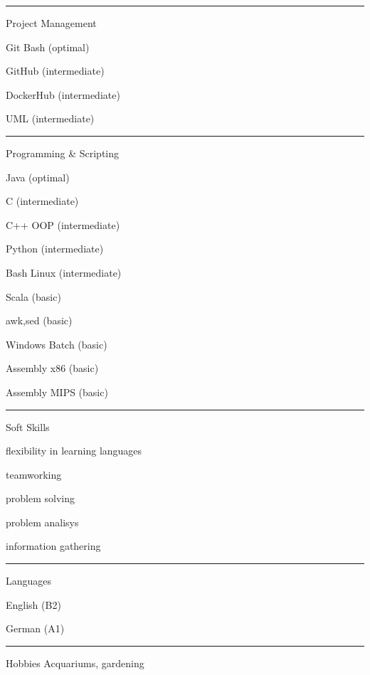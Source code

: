 \documentclass[a4paper]{letter}
\begin{document}
\begin{minipage}[t]{0.30\textwidth}
\setlength{\baselineskip}{1.5\baselineskip}
\color{white}

\vspace{2.1 mm}
\rule{\linewidth}{0.4pt}

{\large Project Management}

\faCode \quad Git Bash (optimal)

\faCode \quad GitHub (intermediate)

\faCode \quad DockerHub (intermediate)

\faCode \quad UML (intermediate)


\rule{\linewidth}{0.4pt}

{\large Programming \& Scripting}

\faCode \quad Java (optimal)

\faCode \quad C (intermediate)

\faCode \quad C++ OOP (intermediate)

\faCode \quad Python (intermediate)

\faCode \quad Bash Linux (intermediate)

\faCode \quad Scala (basic)

\faCode \quad awk,sed (basic)

\faCode \quad Windows Batch (basic)

\faCode \quad Assembly x86 (basic)

\faCode \quad Assembly MIPS (basic)

\rule{\linewidth}{0.4pt}

{\large Soft Skills}

\faCircleNotch \quad flexibility in learning languages

\faCircleNotch \quad teamworking

\faCircleNotch \quad problem solving

\faCircleNotch \quad problem analisys

\faCircleNotch \quad information gathering

\rule{\linewidth}{0.4pt}

{\large Languages}

\faLanguage \quad English  (B2)

\faLanguage \quad German  (A1)

\rule{\linewidth}{0.4pt}

{\large Hobbies}
\newline Acquariums, gardening

\end{minipage}
\end{document}
